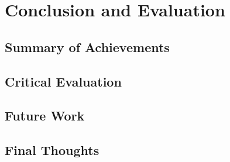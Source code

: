 \chapter{Conclusion and Evaluation}

\section{Summary of Achievements}

\section{Critical Evaluation}

\section{Future Work}

\section{Final Thoughts}
